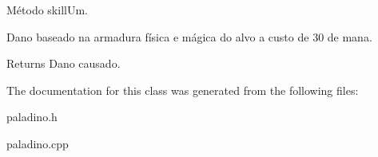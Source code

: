 Método skill\+Um. 

Dano baseado na armadura física e mágica do alvo a custo de 30 de mana. \begin{DoxyReturn}{Returns}
Dano causado. 
\end{DoxyReturn}


The documentation for this class was generated from the following files\+:\begin{DoxyCompactItemize}
\item 
paladino.\+h\item 
paladino.\+cpp\end{DoxyCompactItemize}
